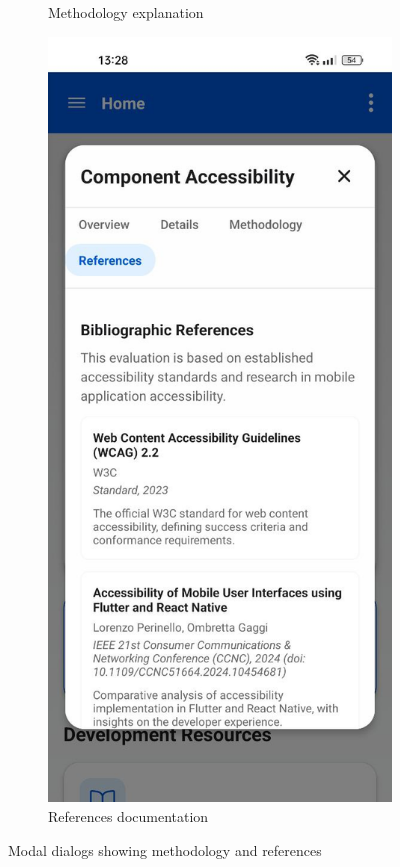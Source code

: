 \begin{figure}[ht]
\begin{subfigure}[b]{0.48\textwidth}
        \caption{Methodology explanation}
        \label{fig:methodology-modal}
    \end{subfigure}
    \hfill
    \begin{subfigure}[b]{0.48\textwidth}
        \centering
        \includegraphics[width=\linewidth]{img/references.jpg}
        \caption{References documentation}
        \label{fig:references-modal}
    \end{subfigure}
    \caption{Modal dialogs showing methodology and references}
    \label{fig:methodology_references}
\end{figure}

